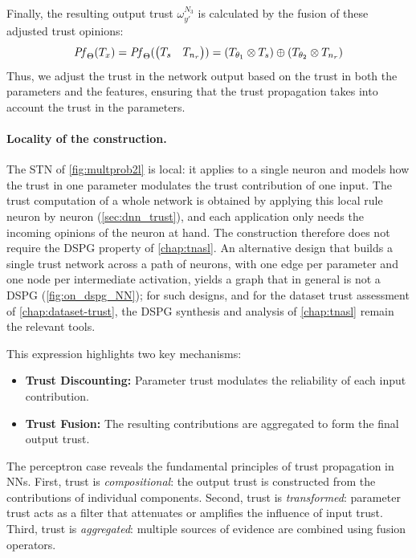 Finally, the resulting output trust \(\omega_{y\prime}^{N_3}\) is calculated by the fusion of these adjusted trust opinions: 
\begin{equation}
\label{eq:sol}
    \mathit{Pf}_\Theta(T_x) = \mathit{Pf}_\Theta(\begin{pmatrix}
    T_s&T_{n_r}
\end{pmatrix}) =  (T_{\theta_1}\otimes T_s)\oplus (T_{\theta_2}\otimes T_{n_r})
\end{equation}
Thus, we adjust the trust in the network output based on the trust in both the parameters and the features, ensuring that the trust propagation takes into account the trust in the parameters.

\paragraph*{Locality of the construction.} The \ac{STN} of \cref{fig:multprob2l} is local: it applies to a single neuron and models how the trust in one parameter modulates the trust contribution of one input. The trust computation of a whole network is obtained by applying this local rule neuron by neuron (\cref{sec:dnn_trust}), and each application only needs the incoming opinions of the neuron at hand. The construction therefore does not require the \ac{DSPG} property of \cref{chap:tnasl}. An alternative design that builds a single trust network across a path of neurons, with one edge per parameter and one node per intermediate activation, yields a graph that in general is not a \ac{DSPG} (\cref{fig:on_dspg_NN}); for such designs, and for the dataset trust assessment of \cref{chap:dataset-trust}, the \ac{DSPG} synthesis and analysis of \cref{chap:tnasl} remain the relevant tools.

This expression highlights two key mechanisms:
\begin{itemize}
    \item \textbf{Trust Discounting:} Parameter trust modulates the reliability of each input contribution.
    \item \textbf{Trust Fusion:} The resulting contributions are aggregated to form the final output trust.
\end{itemize}
\noindent The perceptron case reveals the fundamental principles of trust propagation in \acp{NN}. First, trust is \emph{compositional}: the output trust is constructed from the contributions of individual components. Second, trust is \emph{transformed}: parameter trust acts as a filter that attenuates or amplifies the influence of input trust. Third, trust is \emph{aggregated}: multiple sources of evidence are combined using fusion operators. 

